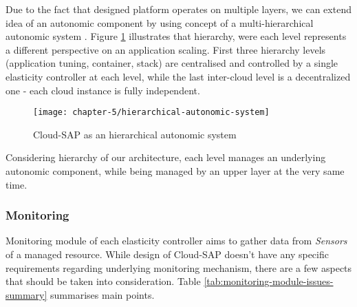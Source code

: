Due to the fact that designed platform operates on multiple layers, we can extend idea of an autonomic component by using concept of a multi-hierarchical autonomic system \cite{LiWoZh05}. Figure \ref{design:hierarchical-autonomic-system} illustrates that hierarchy, were each level represents a different perspective on an application scaling. First three hierarchy levels (application tuning, container, stack) are centralised and controlled by a single elasticity controller at each level, while the last inter-cloud level is a decentralized one - each cloud instance is fully independent.

\begin{figure}[!ht]
  \begin{center}
    \texttt{[image: chapter-5/hierarchical-autonomic-system]}
  \end{center}
  \caption{Cloud-SAP as an hierarchical autonomic system}
  \label{design:hierarchical-autonomic-system}
\end{figure}

Considering hierarchy of our architecture, each level manages an underlying autonomic component, while being managed by an upper layer at the very same time.

\subsubsection{Monitoring}
Monitoring module of each elasticity controller aims to gather data from \textit{Sensors} of a managed resource. While design of Cloud-SAP doesn't have any specific requirements regarding underlying monitoring mechanism, there are a few aspects that should be taken into consideration. Table \ref{tab:monitoring-module-issues-summary} summarises main points.

